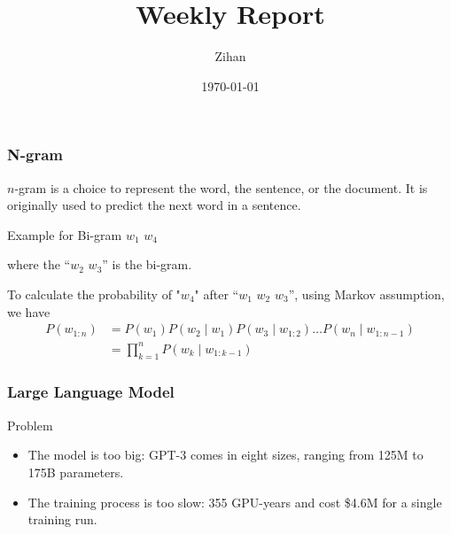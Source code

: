 \documentclass[serif]{beamer}
\title{Weekly Report}
\author{Zihan}
\date{\today}
\begin{document}
\begin{frame}
    \frametitle{N-gram}

    $n$-gram is a choice to represent the word, the sentence, or the document. It is originally used to predict the next word in a sentence. 

    \begin{block}{Example for Bi-gram}
        $w_1$  $w_4$

        where the ``$w_2$ $w_3$'' is the bi-gram.
    \end{block}

    To calculate the probability of "$w_4$" after ``$w_1$ $w_2$ $w_3$'', using Markov assumption, we have
    \begin{align*}
        P\left(w_{1: n}\right) & =P\left(w_1\right) P\left(w_2 \mid w_1\right) P\left(w_3 \mid w_{1: 2}\right) \ldots P\left(w_n \mid w_{1: n-1}\right) \\
        & =\prod_{k=1}^n P\left(w_k \mid w_{1: k-1}\right)
    \end{align*}

\end{frame}


\begin{frame}
    \frametitle{Large Language Model}

    \begin{block}{Problem}
        \begin{itemize}
            \item The model is too big: GPT-3 comes in eight sizes, ranging from 125M to 175B parameters.
            \item The training process is too slow: 355 GPU-years and cost \$4.6M for a single training run.
        \end{itemize}
    \end{block}
\end{frame}

\end{document}
